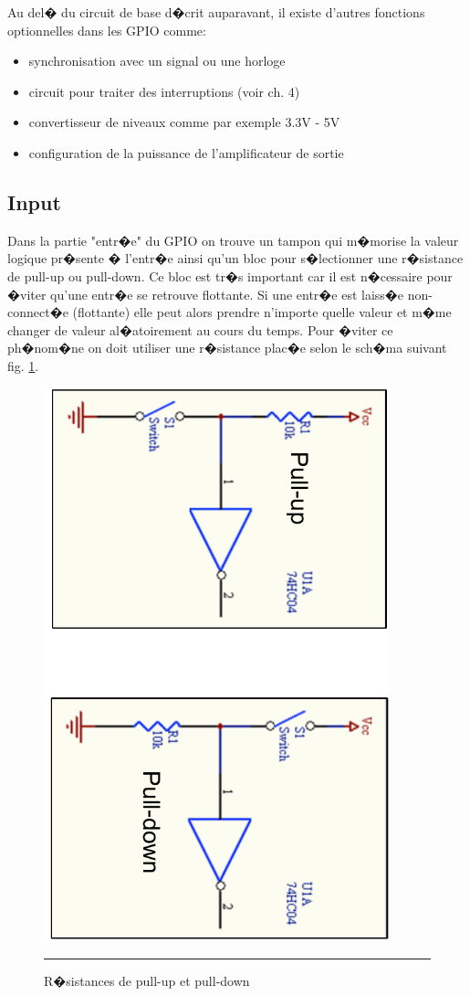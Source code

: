 Au del� du circuit de base d�crit auparavant, il existe d'autres fonctions optionnelles dans les GPIO comme:
\begin{itemize}[label=\textbullet,font=\small]
\item synchronisation avec un signal ou une horloge 
\item circuit pour traiter des interruptions (voir ch. 4)
\item convertisseur de niveaux comme par exemple 3.3V - 5V
\item configuration de la puissance de l'amplificateur de sortie
\end{itemize}

\subsection{Input}

Dans la partie "entr�e" du GPIO on trouve un tampon qui m�morise la valeur logique pr�sente � l'entr�e ainsi qu'un bloc pour s�lectionner une r�sistance de pull-up ou pull-down. Ce bloc est tr�s important car il est n�cessaire pour �viter qu'une entr�e se retrouve flottante. Si une entr�e est laiss�e non-connect�e (flottante) elle peut alors prendre n'importe quelle valeur et m�me changer de valeur al�atoirement au cours du temps. Pour �viter ce ph�nom�ne on doit utiliser une r�sistance plac�e selon le sch�ma suivant fig. \ref{fig:pullres}.

\begin{figure}[htb]
  \centering
  \includegraphics[angle=90, width=10cm]{./Figures/gpio/pullres.pdf}
  \rule{35em}{0.5pt}
  \caption[res pull]{R�sistances de pull-up et pull-down}
  \label{fig:pullres}
\end{figure}

